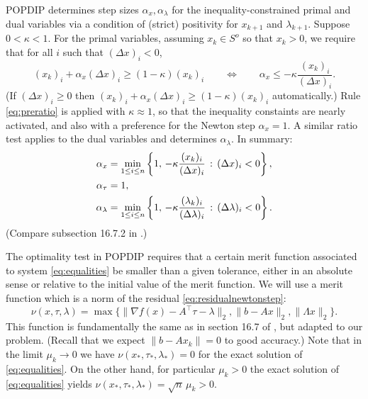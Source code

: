 \documentclass[11pt]{article}
\newcommand{\grad}{\nabla}
\begin{document}
POPDIP determines step sizes $\alpha_x,\alpha_\lambda$ for the inequality-constrained primal and dual variables via a condition of (strict) positivity for $x_{k+1}$ and $\lambda_{k+1}$.  Suppose $0<\kappa<1$.  For the primal variables, assuming $x_k\in S^o$ so that $x_k>0$, we require that for all $i$ such that $(\Delta x)_i < 0$,
\begin{equation}
(x_k)_i + \alpha_x (\Delta x)_i \ge (1-\kappa) (x_k)_i \qquad \iff \qquad \alpha_x \le - \kappa \frac{(x_k)_i}{(\Delta x)_i}. \label{eq:preratio}
\end{equation}
(If $(\Delta x)_i \ge 0$ then $(x_k)_i + \alpha_x (\Delta x)_i \ge (1-\kappa) (x_k)_i$ automatically.)  Rule \eqref{eq:preratio} is applied with $\kappa \approx 1$, so that the inequality constaints are nearly activated, and also with a preference for the Newton step $\alpha_x=1$.  A similar ratio test applies to the dual variables and determines $\alpha_\lambda$.  In summary:
\begin{align}
\alpha_x &= \min_{1\le i\le n} \left\{1, \,-\kappa \frac{(x_k)_i}{(\Delta x)_i} \,:\, (\Delta x)_i < 0\right\}, \label{eq:ratiotests} \\
\alpha_\tau &= 1, \notag \\
\alpha_\lambda &= \min_{1\le i\le n} \left\{1, \,-\kappa \frac{(\lambda_k)_i}{(\Delta \lambda)_i} \,:\, (\Delta \lambda)_i < 0\right\}. \notag
\end{align}
(Compare subsection 16.7.2 in \cite{GrivaNashSofer2009}.)

The optimality test in POPDIP requires that a certain merit function associated to system \eqref{eq:equalities} be smaller than a given tolerance, either in an absolute sense or relative to the initial value of the merit function.  We will use a merit function which is a norm of the residual \eqref{eq:residualnewtonstep}:
\begin{equation}
    \nu(x,\tau,\lambda) = \max\{\|\grad f(x)-A^\top \tau - \lambda\|_2,\|b-Ax\|_2,\|\Lambda x\|_2\}.  \label{eq:meritfunction}
\end{equation}
This function is fundamentally the same as in section 16.7 of \cite{GrivaNashSofer2009}, but adapted to our problem.  (Recall that we expect $\|b-Ax_k\|=0$ to good accuracy.)  Note that in the limit $\mu_k\to 0$ we have $\nu(x_*,\tau_*,\lambda_*) = 0$ for the exact solution of \eqref{eq:equalities}.  On the other hand, for particular $\mu_k > 0$ the exact solution of \eqref{eq:equalities} yields $\nu(x_*,\tau_*,\lambda_*)=\sqrt{n}\, \mu_k>0$.
\end{document}
